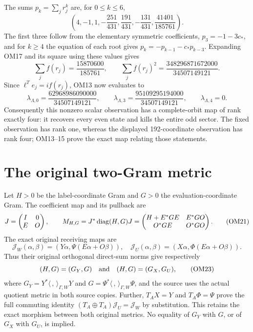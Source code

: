 The sums $p_k=\sum_jr_j^k$ are, for $0\le k\le6$,
\[
\left(4,-1,1,-\frac{251}{431},\frac{191}{431},
             -\frac{131}{431},\frac{41401}{185761}\right).
\tag{OM18}
\]
The first three follow from the elementary symmetric coefficients,
$p_3=-1-3c_*$, and for $k\ge4$ the equation of each root gives
$p_k=-p_{k-1}-c_*p_{k-3}$.  Expanding OM17 and its square using
these values gives
\[
\sum_jf(r_j)=\frac{15870600}{185761},\qquad
\sum_jf(r_j)^2=\frac{348296871672000}{34507149121}.
\tag{OM19}
\]
Since $\ell^Te_j=if(r_j)$, OM13 now evaluates to
\[
\lambda_{\Lambda,0}=\frac{62968986090000}{34507149121},
\qquad
\lambda_{\Lambda,3}=\frac{95109295194000}{34507149121},
\qquad
\lambda_{\Lambda,4}=0.
\tag{OM20}
\]
Consequently this nonzero scalar observation has a complete-orbit
map of rank exactly four: it recovers every even state and kills
the entire odd sector.  The fixed observation has rank one, whereas
the displayed 192-coordinate observation has rank four; OM13--15
prove the exact map relating those statements.

\section{The original two-Gram metric}
Let $H>0$ be the label-coordinate Gram and $G>0$ the
evaluation-coordinate Gram.  The coefficient map and its pullback
are
\[
J=\begin{pmatrix}I&0\\E&O\end{pmatrix},\qquad
M_{H,G}=J^*\operatorname{diag}(H,G)J
=\begin{pmatrix}H+E^*GE&E^*GO\\O^*GE&O^*GO\end{pmatrix}.
\tag{OM21}
\]
The exact original receiving maps are
\[
\mathcal J_W(\alpha,\beta)
 =(Y\alpha,\Psi(E\alpha+O\beta)),\quad
\mathcal J_U(\alpha,\beta)
 =(X\alpha,\Phi(E\alpha+O\beta)).
\tag{OM22}
\]
Thus their original orthogonal direct-sum norms give respectively
\[
(H,G)=(G_Y,G)\quad\hbox{and}\quad(H,G)=(G_X,G_U),
\tag{OM23}
\]
where $G_Y=Y^*\langle\, ,\,\rangle_{\Gamma,W}Y$ and
$G=\Psi^*\langle\, ,\,\rangle_{\Gamma,W}\Psi$, and the source
uses the actual quotient metric in both source copies.  Further,
$T_AX=Y$ and $T_A\Phi=\Psi$ prove the full commuting identity
$(T_A\oplus T_A)\mathcal J_U=\mathcal J_W$ by substitution.
This retains the exact morphism between both original metrics.
No equality of $G_Y$ with $G$, or of $G_X$ with $G_U$, is implied.

